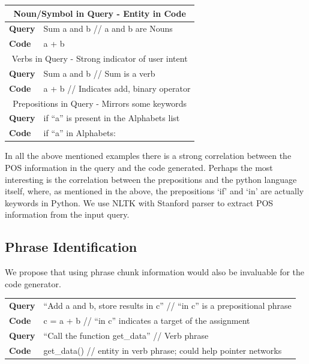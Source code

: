 \documentclass{IEEEtran}
\begin{document}
    \bigskip
    \begin{tabular}{ l | l }
      \hline
      \multicolumn{2}{c}{Noun/Symbol in Query - Entity in Code} \\
      \hline
      \textbf{Query} & Sum a and b // a and b are Nouns \\
      \textbf{Code}  & a + b \\
      \hline
      \multicolumn{2}{c}{Verbs in Query - Strong indicator of user intent} \\
      \hline
      \textbf{Query} & Sum a and b // Sum is a verb \\  
      \textbf{Code}  & a + b // Indicates add, binary operator \\
      \hline
      \multicolumn{2}{c}{Prepositions in Query  - Mirrors some keywords} \\
      \hline
      \textbf{Query} & if “a” is present in the Alphabets list \\ 
      \textbf{Code}  & if “a” in Alphabets: \\
      \hline
    \end{tabular}
    \bigskip

    In all the above mentioned examples there is a strong correlation
    between the POS information in the query and the code generated.
    Perhaps the most interesting is the correlation between the prepositions
    and the python language itself, where, as mentioned in the above, the
    prepositions `if' and `in' are actually keywords in Python. We use
    NLTK with Stanford parser to extract POS information from the input
    query.

    \subsection{Phrase Identification}
    We propose that using phrase chunk information would also be invaluable
    for the code generator.

    \bigskip
    \begin{tabular}{ l | p{6.5cm} }
      \hline
      \textbf{Query} & ``Add a and b, store results in c'' // ``in c'' is a prepositional phrase \\
      \textbf{Code}  & c = a + b // ``in c'' indicates a target of the assignment \\
      \hline
      \textbf{Query} & ``Call the function get\_data'' // Verb phrase \\ 
      \textbf{Code}  & get\_data() // entity in verb phrase; could help pointer networks \\
      \hline
    \end{tabular}
    \bigskip
\end{document}
